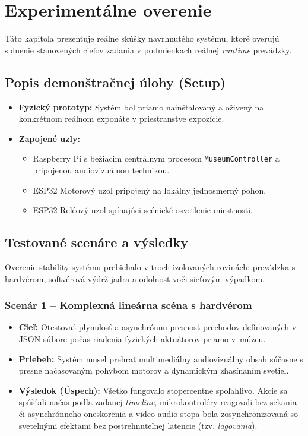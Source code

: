 \chapter{Experimentálne overenie}
\label{ExperimentalneOverenie}

Táto kapitola prezentuje reálne skúšky navrhnutého systému, ktoré overujú splnenie stanovených cieľov zadania v podmienkach reálnej \textit{runtime} prevádzky.

\section{Popis demonštračnej úlohy (Setup)}
\label{PopisDemonstracie}

\begin{itemize}
    \item \textbf{Fyzický prototyp:} Systém bol priamo nainštalovaný a oživený na konkrétnom reálnom exponáte v priestranstve expozície.
    \item \textbf{Zapojené uzly:}
    \begin{itemize}
        \item Raspberry Pi s bežiacim centrálnym procesom \texttt{MuseumController} a pripojenou audiovizuálnou technikou.
        \item ESP32 Motorový uzol pripojený na lokálny jednosmerný pohon.
        \item ESP32 Reléový uzol spínajúci scénické osvetlenie miestnosti.
    \end{itemize}
\end{itemize}

\section{Testované scenáre a výsledky}
\label{TestovaneScenare}

Overenie stability systému prebiehalo v troch izolovaných rovinách: prevádzka s hardvérom, softvérová výdrž jadra a odolnosť voči sieťovým výpadkom.

\subsection{Scenár 1 -- Komplexná lineárna scéna s hardvérom}
\begin{itemize}
    \item \textbf{Cieľ:} Otestovať plynulosť a asynchrónnu presnosť prechodov definovaných v JSON súbore počas riadenia fyzických aktuátorov priamo v~múzeu.
    \item \textbf{Priebeh:} Systém musel prehrať multimediálny audiovizuálny obsah súčasne s presne načasovaným pohybom motorov a dynamickým zhasínaním svetiel.
    \item \textbf{Výsledok (Úspech):} Všetko fungovalo stopercentne spoľahlivo. Akcie sa spúšťali načas podľa zadanej \textit{timeline}, mikrokontroléry reagovali bez sekania či asynchrónneho oneskorenia a video-audio stopa bola zosynchronizovaná so svetelnými efektami bez postrehnuteľnej latencie (tzv. \textit{lagovania}).
\end{itemize}

